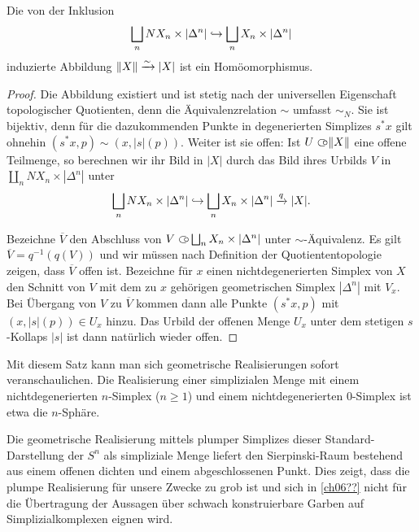 \begin{satz}
  Die von der Inklusion
  \[ \bigsqcup_n NX_n \times |\Delta^n| \hookrightarrow \bigsqcup_n X_n \times |\Delta^n| \]
  induzierte Abbildung $\|X\| \xrightarrow[]{\sim} |X|$ ist ein Homöomorphismus.
\end{satz}
\begin{proof}
  Die Abbildung existiert und ist stetig nach der universellen
  Eigenschaft topologischer Quotienten, denn die Äquivalenzrelation
  $\sim$ umfasst $\sim_N$. Sie ist bijektiv, denn für die
  dazukommenden Punkte in degenerierten Simplizes $s^* x$ gilt ohnehin
  $(s^* x, p) \sim (x, |s|(p))$. Weiter ist sie offen: Ist $U \subset\kern-0.58em\circ
  \|X\|$ eine offene Teilmenge, so berechnen wir ihr Bild in $|X|$
  durch das Bild ihres Urbilds $V$ in $\coprod_n NX_n \times
  |\Delta^n|$ unter
  \[ \bigsqcup_n NX_n \times |\Delta^n|
  \hookrightarrow \bigsqcup_n X_n \times |\Delta^n| \xrightarrow{q} |X|. \]

  Bezeichne $\overline{V}$ den Abschluss von $V \subset\kern-0.58em\circ \bigsqcup_n X_n
  \times |\Delta^n|$ unter $\sim$-Äquivalenz. Es gilt $\overline{V} =
  q^{-1}(q(V))$ und wir müssen nach Definition der Quotiententopologie
  zeigen, dass $\overline{V}$ offen ist. Bezeichne für $x$ einen
  nichtdegenerierten Simplex von $X$ den Schnitt von $V$ mit dem zu
  $x$ gehörigen geometrischen Simplex $|\Delta^n|$ mit $V_x$. Bei
  Übergang von $V$ zu $\overline{V}$ kommen dann alle Punkte $(s^* x,
  p)$ mit $(x, |s|(p)) \in U_x$ hinzu. Das Urbild der offenen Menge $U_x$
  unter dem stetigen $s$-Kollaps $|s|$ ist dann natürlich wieder
  offen.
\end{proof}
\begin{bsp} \label{ex:real-sphere}
  Mit diesem Satz kann man sich geometrische Realisierungen sofort
  veranschaulichen. Die Realisierung einer simplizialen Menge mit
  einem nichtdegenerierten $n$-Simplex ($n \geq 1$) und einem
  nichtdegenerierten $0$-Simplex ist etwa die $n$-Sphäre.
\end{bsp}
\begin{bsp} \label{ex:clumsy-sphere}
  Die geometrische Realisierung mittels plumper Simplizes dieser
  Standard-Darstellung der $S^n$ als simpliziale Menge liefert den
  Sierpinski-Raum bestehend aus einem offenen dichten und einem
  abgeschlossenen Punkt. Dies zeigt, dass die plumpe Realisierung für
  unsere Zwecke zu grob ist und sich in \ref{ch06??} nicht für die
  Übertragung der Aussagen über schwach konstruierbare Garben auf
  Simplizialkomplexen eignen wird.
\end{bsp}

